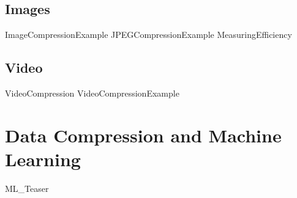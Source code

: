   \subsection{Images}
            {ImageCompressionExample}
            {JPEGCompressionExample}
            {MeasuringEfficiency}
  \subsection{Video}
            {VideoCompression}
            {VideoCompressionExample}


\section{Data Compression and Machine Learning}
{ML_Teaser}




